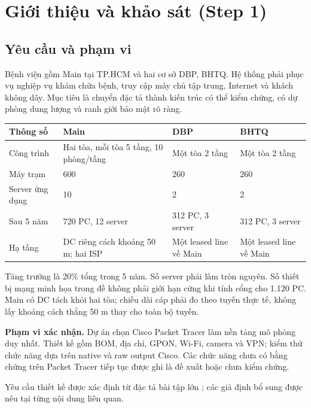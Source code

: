 \documentclass[
  11pt,
]{article}
\author{}
\date{}
\begin{document}

\setcounter{tocdepth}{2}
\tableofcontents
{}
{}
\listoffigures
\clearpage
{}
{}
\listoftables
\clearpage
{}
\pagestyle{fancy}
\section{Giới thiệu và khảo sát (Step 1)}
\subsection{Yêu cầu và phạm vi}
Bệnh viện gồm Main tại TP.HCM và hai cơ sở DBP, BHTQ. Hệ thống phải phục vụ nghiệp vụ khám chữa bệnh, truy cập máy chủ tập trung, Internet và khách không dây. Mục tiêu là chuyển đặc tả thành kiến trúc có thể kiểm chứng, có dự phòng dung lượng và ranh giới bảo mật rõ ràng.
\par\noindent
{}
\begin{tabularx}{\linewidth}{@{}lXXX@{}}\toprule
Thông số & Main & DBP & BHTQ\\\midrule
Công trình & Hai tòa, mỗi tòa 5 tầng, 10 phòng/tầng & Một tòa 2 tầng & Một tòa 2 tầng\\
Máy trạm & 600 & 260 & 260\\
Server ứng dụng & 10 & 2 & 2\\
Sau 5 năm & 720 PC, 12 server & 312 PC, 3 server & 312 PC, 3 server\\
Hạ tầng & DC riêng cách khoảng 50 m; hai ISP & Một leased line về Main & Một leased line về Main\\\bottomrule\end{tabularx}\par

Tăng trưởng là 20\% tổng trong 5 năm. Số server phải làm tròn nguyên. Số thiết bị mạng minh họa trong đề không phải giới hạn cứng khi tính cổng cho 1.120 PC. Main có DC tách khỏi hai tòa; chiều dài cáp phải đo theo tuyến thực tế, không lấy khoảng cách thẳng 50 m thay cho toàn bộ tuyến.

\textbf{Phạm vi xác nhận.} Dự án chọn Cisco Packet Tracer làm nền tảng mô phỏng duy nhất. Thiết kế gồm BOM, địa chỉ, GPON, Wi-Fi, camera và VPN; kiểm thử chức năng dựa trên native và raw output Cisco. Các chức năng chưa có bằng chứng trên Packet Tracer tiếp tục được ghi là đề xuất hoặc chưa kiểm chứng.

Yêu cầu thiết kế được xác định từ đặc tả bài tập lớn \cite{assignment}; các giả định bổ sung được nêu tại từng nội dung liên quan.
\end{document}
